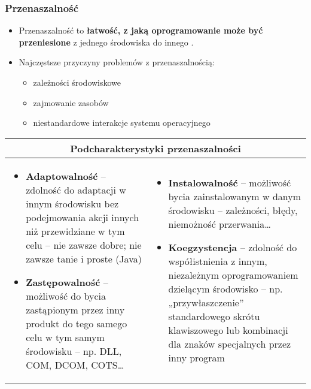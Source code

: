 \documentclass[../main.tex]{subfiles}
\begin{document}
    \subsubsection{Przenaszalność}
    \begin{itemize}
        \item Przenaszalność to \textbf{łatwość, z jaką oprogramowanie może być przeniesione} z jednego środowiska do innego .
        \item Najczęstsze przyczyny problemów z przenaszalnością:
        \begin{itemize}
            \item zależności środowiskowe
            \item zajmowanie zasobów
            \item niestandardowe interakcje systemu operacyjnego
        \end{itemize}
    \end{itemize}

    \begin{table}[H]
        \begin{center}
            \begin{tabular}{| p{8cm} | p{8cm} |}
                \hline
                \multicolumn{2}{|c|}{\textbf{Podcharakterystyki przenaszalności}} \\
                \hline
                \begin{itemize}
                    \item \textbf{Adaptowalność} – zdolność do adaptacji w innym środowisku bez
                    podejmowania akcji innych niż przewidziane w tym celu – nie zawsze dobre; nie zawsze tanie i proste (Java)
                    \item \textbf{Zastępowalność} – możliwość do bycia zastąpionym przez inny
                    produkt do tego samego celu w tym samym środowisku – np. DLL, COM, DCOM, COTS…
                \end{itemize}
                &
                \begin{itemize}
                    \item \textbf{Instalowalność} – możliwość bycia zainstalowanym w danym środowisku
                    – zależności, błędy, niemożność przerwania…
                    \item \textbf{Koegzystencja} – zdolność do współistnienia z innym, niezależnym oprogramowaniem dzielącym środowisko
                    – np. „przywłaszczenie” standardowego skrótu klawiszowego lub kombinacji dla znaków specjalnych przez inny program
                \end{itemize} \\
                \hline
            \end{tabular}
        \end{center}
    \end{table}
\end{document}
